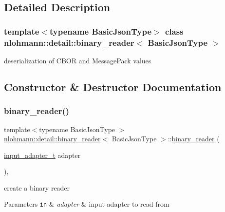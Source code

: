 \subsection{Detailed Description}
\subsubsection*{template$<$typename Basic\+Json\+Type$>$\newline
class nlohmann\+::detail\+::binary\+\_\+reader$<$ Basic\+Json\+Type $>$}

deserialization of C\+B\+OR and Message\+Pack values 

\subsection{Constructor \& Destructor Documentation}
\mbox{\label{classnlohmann_1_1detail_1_1binary__reader_a7e643baadaf4c31718cd74833bdd542f}} 
\subsubsection{\texorpdfstring{binary\+\_\+reader()}{binary\_reader()}}
{\footnotesize\ttfamily template$<$typename Basic\+Json\+Type $>$ \\
\hyperlink{classnlohmann_1_1detail_1_1binary__reader}{nlohmann\+::detail\+::binary\+\_\+reader}$<$ Basic\+Json\+Type $>$\+::\hyperlink{classnlohmann_1_1detail_1_1binary__reader}{binary\+\_\+reader} (\begin{DoxyParamCaption}\item[{\hyperlink{namespacenlohmann_1_1detail_ae132f8cd5bb24c5e9b40ad0eafedf1c2}{input\+\_\+adapter\+\_\+t}}]{adapter }\end{DoxyParamCaption})\hspace{0.3cm}{\ttfamily [inline]}, {\ttfamily [explicit]}}



create a binary reader 


\begin{DoxyParams}[1]{Parameters}
\mbox{\tt in}  & {\em adapter} & input adapter to read from \\
\hline
\end{DoxyParams}


